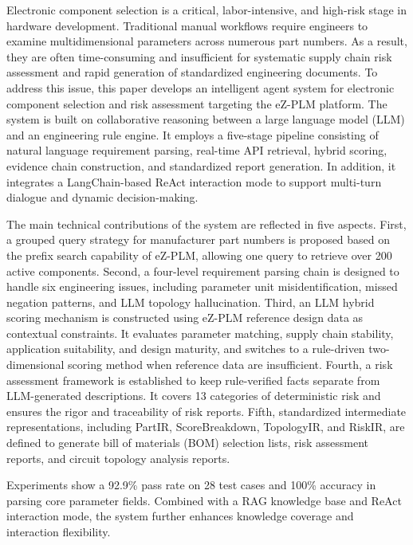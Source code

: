 Electronic component selection is a critical, labor-intensive, and high-risk stage in hardware development. Traditional manual workflows require engineers to examine multidimensional parameters across numerous part numbers. As a result, they are often time-consuming and insufficient for systematic supply chain risk assessment and rapid generation of standardized engineering documents. To address this issue, this paper develops an intelligent agent system for electronic component selection and risk assessment targeting the eZ-PLM platform. The system is built on collaborative reasoning between a large language model (LLM) and an engineering rule engine. It employs a five-stage pipeline consisting of natural language requirement parsing, real-time API retrieval, hybrid scoring, evidence chain construction, and standardized report generation. In addition, it integrates a LangChain-based ReAct interaction mode to support multi-turn dialogue and dynamic decision-making.

The main technical contributions of the system are reflected in five aspects. First, a grouped query strategy for manufacturer part numbers is proposed based on the prefix search capability of eZ-PLM, allowing one query to retrieve over 200 active components. Second, a four-level requirement parsing chain is designed to handle six engineering issues, including parameter unit misidentification, missed negation patterns, and LLM topology hallucination. Third, an LLM hybrid scoring mechanism is constructed using eZ-PLM reference design data as contextual constraints. It evaluates parameter matching, supply chain stability, application suitability, and design maturity, and switches to a rule-driven two-dimensional scoring method when reference data are insufficient. Fourth, a risk assessment framework is established to keep rule-verified facts separate from LLM-generated descriptions. It covers 13 categories of deterministic risk and ensures the rigor and traceability of risk reports. Fifth, standardized intermediate representations, including PartIR, ScoreBreakdown, TopologyIR, and RiskIR, are defined to generate bill of materials (BOM) selection lists, risk assessment reports, and circuit topology analysis reports.

Experiments show a 92.9\% pass rate on 28 test cases and 100\% accuracy in parsing core parameter fields. Combined with a RAG knowledge base and ReAct interaction mode, the system further enhances knowledge coverage and interaction flexibility.